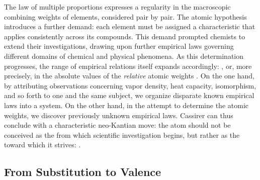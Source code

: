 \documentclass[submitted,12pt]{article}
\renewcommand{\SF}[2]{\citep[#1/#2]{Cassirer1910}}
\begin{document}
The law of multiple proportions expresses a regularity in the macroscopic combining weights of elements, considered pair by pair. The atomic hypothesis introduces a further demand: each element must be assigned a characteristic  that applies consistently across its compounds. This demand prompted chemists to extend their investigations, drawing upon further empirical laws governing different domains of chemical and physical phenomena.  As this determination progresses, the range of empirical relations itself expands accordingly: , or, more precisely, in the absolute values of the \emph{relative} atomic weights \SF{277}{209}. On the one hand, by attributing observations concerning vapor density, heat capacity, isomorphism, and so forth to one and the same subject, we organize disparate known empirical laws into a system. On the other hand, in the attempt to determine the atomic weights, we discover previously unknown empirical laws. Cassirer can thus conclude with a characteristic neo-Kantian move: the atom should not be conceived as the  from which scientific investigation begins, but rather as the  toward which it strives:  \SF{280}{210}.  

\subsection{From Substitution to Valence}
\end{document}
